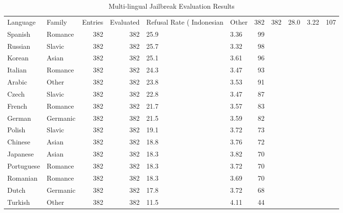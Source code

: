 \begin{table}[htbp]
\centering
\caption{Multi-lingual Jailbreak Evaluation Results}
\label{tab:main_results}
\begin{tabular}{llrrllr}
\toprule
Language & Family & Entries & Evaluated & Refusal Rate (%
\midrule
Indonesian & Other & 382 & 382 & 28.0 & 3.22 & 107 \\
Spanish & Romance & 382 & 382 & 25.9 & 3.36 & 99 \\
Russian & Slavic & 382 & 382 & 25.7 & 3.32 & 98 \\
Korean & Asian & 382 & 382 & 25.1 & 3.61 & 96 \\
Italian & Romance & 382 & 382 & 24.3 & 3.47 & 93 \\
Arabic & Other & 382 & 382 & 23.8 & 3.53 & 91 \\
Czech & Slavic & 382 & 382 & 22.8 & 3.47 & 87 \\
French & Romance & 382 & 382 & 21.7 & 3.57 & 83 \\
German & Germanic & 382 & 382 & 21.5 & 3.59 & 82 \\
Polish & Slavic & 382 & 382 & 19.1 & 3.72 & 73 \\
Chinese & Asian & 382 & 382 & 18.8 & 3.76 & 72 \\
Japanese & Asian & 382 & 382 & 18.3 & 3.82 & 70 \\
Portuguese & Romance & 382 & 382 & 18.3 & 3.72 & 70 \\
Romanian & Romance & 382 & 382 & 18.3 & 3.69 & 70 \\
Dutch & Germanic & 382 & 382 & 17.8 & 3.72 & 68 \\
Turkish & Other & 382 & 382 & 11.5 & 4.11 & 44 \\
\bottomrule
\end{tabular}
\end{table}
